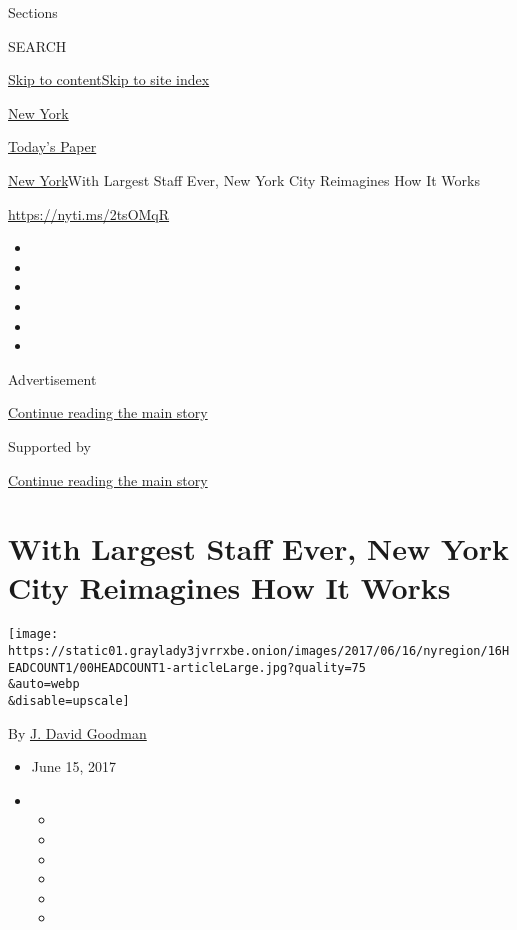 Sections

SEARCH

\protect\hyperlink{site-content}{Skip to
content}\protect\hyperlink{site-index}{Skip to site index}

\href{https://www.nytimes3xbfgragh.onion/section/nyregion}{New York}

\href{https://myaccount.nytimes3xbfgragh.onion/auth/login?response_type=cookie\&client_id=vi}{}

\href{https://www.nytimes3xbfgragh.onion/section/todayspaper}{Today's
Paper}

\href{/section/nyregion}{New York}\textbar{}With Largest Staff Ever, New
York City Reimagines How It Works

\url{https://nyti.ms/2tsOMqR}

\begin{itemize}
\item
\item
\item
\item
\item
\item
\end{itemize}

Advertisement

\protect\hyperlink{after-top}{Continue reading the main story}

Supported by

\protect\hyperlink{after-sponsor}{Continue reading the main story}

\hypertarget{with-largest-staff-ever-new-york-city-reimagines-how-it-works}{%
\section{With Largest Staff Ever, New York City Reimagines How It
Works}\label{with-largest-staff-ever-new-york-city-reimagines-how-it-works}}

\texttt{[image: https://static01.graylady3jvrrxbe.onion/images/2017/06/16/nyregion/16HEADCOUNT1/00HEADCOUNT1-articleLarge.jpg?quality=75\\\&auto=webp\\\&disable=upscale]}

By \href{http://www.nytimes3xbfgragh.onion/by/j-david-goodman}{J. David
Goodman}

\begin{itemize}
\item
  June 15, 2017
\item
  \begin{itemize}
  \item
  \item
  \item
  \item
  \item
  \item
  \end{itemize}
\end{itemize}

